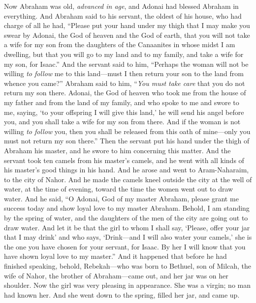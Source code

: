 \begin{biblechapter} %
 Now Abraham was old, \textit{advanced in age}, and Adonai had blessed Abraham in everything.
\verse And Abraham said to his servant, the oldest of his house, who had charge of all he had, “Please put your hand under my thigh
\verse that I may make you swear by Adonai, the God of heaven and the God of earth, that you will not take a wife for my son from the daughters of the Canaanites in whose midst I am dwelling,
\verse but that you will go to my land and to my family, and take a wife for my son, for Isaac.”
\verse And the servant said to him, “Perhaps the woman will not be willing \textit{to follow} me to this land—must I then return your son to the land from whence you came?”
\verse Abraham said to him, “\textit{You must take care} that you do not return my son there.
\verse Adonai, the God of heaven who took me from the house of my father and from the land of my family, and who spoke to me and swore to me, saying, ‘to your offspring I will give this land,’ he will send his angel before you, and you shall take a wife for my son from there.
\verse And if the woman is not willing \textit{to follow} you, then you shall be released from this oath of mine—only you must not return my son there.”
\verse Then the servant put his hand under the thigh of Abraham his master, and he swore to him concerning this matter.
\verse And the servant took ten camels from his master’s camels, and he went with all kinds of his master’s good things in his hand. And he arose and went to Aram-Naharaim, to the city of Nahor.
\verse And he made the camels kneel outside the city at the well of water, at the time of evening, toward the time the women went out to draw water.
\verse And he said, “O Adonai, God of my master Abraham, please grant me success today and show loyal love to my master Abraham.
\verse Behold, I am standing by the spring of water, and the daughters of the men of the city are going out to draw water.
\verse And let it be that the girl to whom I shall say, ‘Please, offer your jar that I may drink’ and who says, ‘Drink—and I will also water your camels,’ she is the one you have chosen for your servant, for Isaac. By her I will know that you have shown loyal love to my master.”
\verse And it happened that before he had finished speaking, behold, Rebekah—who was born to Bethuel, son of Milcah, the wife of Nahor, the brother of Abraham—came out, and her jar was on her shoulder.
\verse Now the girl was very pleasing in appearance. She was a virgin; no man had known her. And she went down to the spring, filled her jar, and came up.

\end{biblechapter}
